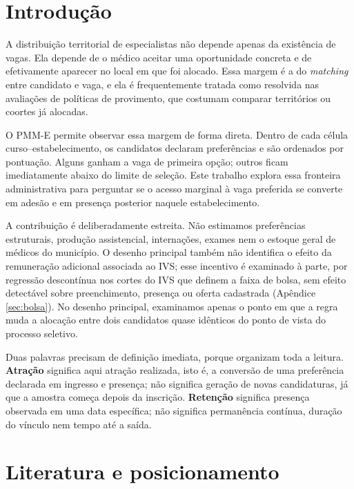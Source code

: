 \documentclass[11pt,a4paper]{article}
\begin{document}
\section{Introdução}
\label{sec:introducao}

A distribuição territorial de especialistas não depende apenas da existência de
vagas. Ela depende de o médico aceitar uma oportunidade concreta e de
efetivamente aparecer no local em que foi alocado. Essa margem é a do
\emph{matching} entre candidato e vaga, e ela é frequentemente tratada como
resolvida nas avaliações de políticas de provimento, que costumam comparar
territórios ou coortes já alocadas.

O PMM-E permite observar essa margem de forma direta. Dentro de cada célula
curso--estabelecimento, os candidatos declaram preferências e são ordenados por
pontuação. Alguns ganham a vaga de primeira opção; outros ficam imediatamente
abaixo do limite de seleção. Este trabalho explora essa fronteira administrativa
para perguntar se o acesso marginal à vaga preferida se converte em adesão e em
presença posterior naquele estabelecimento.

A contribuição é deliberadamente estreita. Não estimamos preferências
estruturais, produção assistencial, internações, exames nem o estoque geral de
médicos do município. O desenho principal também não identifica o efeito da
remuneração adicional associada ao IVS; esse incentivo é examinado à parte, por
regressão descontínua nos cortes do IVS que definem a faixa de bolsa, sem
efeito detectável sobre preenchimento, presença ou oferta cadastrada
(Apêndice \ref{sec:bolsa}). No desenho principal,
examinamos apenas o ponto em que a regra muda a alocação entre dois candidatos
quase idênticos do ponto de vista do processo seletivo.

Duas palavras precisam de definição imediata, porque organizam toda a leitura.
\textbf{Atração} significa aqui atração realizada, isto é, a conversão de uma
preferência declarada em ingresso e presença; não significa geração de novas
candidaturas, já que a amostra começa depois da inscrição. \textbf{Retenção}
significa presença observada em uma data específica; não significa permanência
contínua, duração do vínculo nem tempo até a saída.

\section{Literatura e posicionamento}
\label{sec:literatura}
\end{document}
